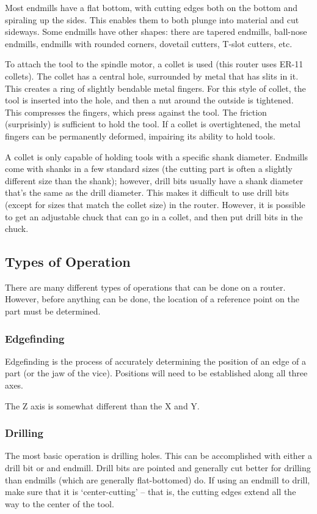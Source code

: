 \documentclass[a4paper,11pt]{article}
\begin{document}
Most endmills have a flat bottom, with cutting edges both on the bottom and spiraling up the sides. This enables them to both plunge into material and cut sideways. Some endmills have other shapes: there are tapered endmills, ball-nose endmills, endmills with rounded corners, dovetail cutters, T-slot cutters, etc. 


To attach the tool to the spindle motor, a collet is used (this router uses ER-11 collets). The collet has a central hole, surrounded by metal that has slits in it. This creates a ring of slightly bendable metal fingers. For this style of collet, the tool is inserted into the hole, and then a nut around the outside is tightened. This compresses the fingers, which press against the tool. The friction (surprisinly) is sufficient to hold the tool. If a collet is overtightened, the metal fingers can be permanently deformed, impairing its ability to hold tools.

A collet is only capable of holding tools with a specific shank diameter. Endmills come with shanks in a few standard sizes (the cutting part is often a slightly different size than the shank); however, drill bits usually have a shank diameter that's the same as the drill diameter. This makes it difficult to use drill bits (except for sizes that match the collet size) in the router. However, it is possible to get an adjustable chuck that can go in a collet, and then put drill bits in the chuck.


\subsection{Types of Operation}
There are many different types of operations that can be done on a router. However, before anything can be done, the location of a reference point on the part must be determined.

\subsubsection{Edgefinding}
Edgefinding is the process of accurately determining the position of an edge of a part (or the jaw of the vice). Positions will need to be established along all three axes. 

The Z axis is somewhat different than the X and Y. 

\subsubsection{Drilling}
The most basic operation is drilling holes. This can be accomplished with either a drill bit or and endmill. Drill bits are pointed and generally cut better for drilling than endmills (which are generally flat-bottomed) do. If using an endmill to drill, make sure that it is `center-cutting' -- that is, the cutting edges extend all the way to the center of the tool. 
\end{document}
